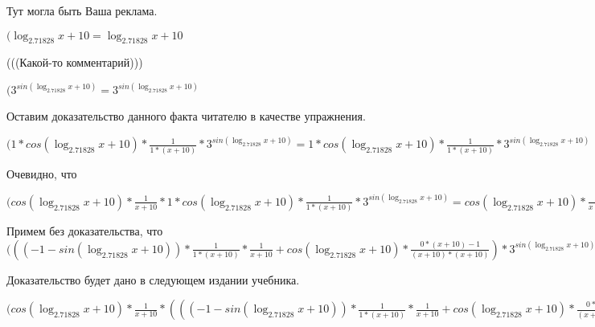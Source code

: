 \documentclass[12pt,a4paper,fleqn]{article}
\theoremstyle{definition}
\begin{document}
Тут могла быть Ваша реклама.

$(\log_{ 2.71828 }{ x  +  10 } = \log_{ 2.71828 }{ x  +  10 }$

(((Какой-то комментарий)))

$({ 3 }^{sin(\log_{ 2.71828 }{ x  +  10 })} = { 3 }^{sin(\log_{ 2.71828 }{ x  +  10 })}$

Оставим доказательство данного факта читателю в качестве упражнения.

$( 1  * cos(\log_{ 2.71828 }{ x  +  10 }) * \frac{ 1 }{ 1  * ( x  +  10 )}
 * { 3 }^{sin(\log_{ 2.71828 }{ x  +  10 })} =  1  * cos(\log_{ 2.71828 }{ x  +  10 }) * \frac{ 1 }{ 1  * ( x  +  10 )}
 * { 3 }^{sin(\log_{ 2.71828 }{ x  +  10 })}$

Очевидно, что

$(cos(\log_{ 2.71828 }{ x  +  10 }) * \frac{ 1 }{ x  +  10 }
 *  1  * cos(\log_{ 2.71828 }{ x  +  10 }) * \frac{ 1 }{ 1  * ( x  +  10 )}
 * { 3 }^{sin(\log_{ 2.71828 }{ x  +  10 })} = cos(\log_{ 2.71828 }{ x  +  10 }) * \frac{ 1 }{ x  +  10 }
 *  1  * cos(\log_{ 2.71828 }{ x  +  10 }) * \frac{ 1 }{ 1  * ( x  +  10 )}
 * { 3 }^{sin(\log_{ 2.71828 }{ x  +  10 })}$

Примем без доказательства, что
$((( -1  - sin(\log_{ 2.71828 }{ x  +  10 })) * \frac{ 1 }{ 1  * ( x  +  10 )}
 * \frac{ 1 }{ x  +  10 }
 + cos(\log_{ 2.71828 }{ x  +  10 }) * \frac{ 0  * ( x  +  10 ) -  1 }{( x  +  10 ) * ( x  +  10 )}
) * { 3 }^{sin(\log_{ 2.71828 }{ x  +  10 })} + cos(\log_{ 2.71828 }{ x  +  10 }) * \frac{ 1 }{ x  +  10 }
 *  1  * cos(\log_{ 2.71828 }{ x  +  10 }) * \frac{ 1 }{ 1  * ( x  +  10 )}
 * { 3 }^{sin(\log_{ 2.71828 }{ x  +  10 })} = (( -1  - sin(\log_{ 2.71828 }{ x  +  10 })) * \frac{ 1 }{ 1  * ( x  +  10 )}
 * \frac{ 1 }{ x  +  10 }
 + cos(\log_{ 2.71828 }{ x  +  10 }) * \frac{ 0  * ( x  +  10 ) -  1 }{( x  +  10 ) * ( x  +  10 )}
) * { 3 }^{sin(\log_{ 2.71828 }{ x  +  10 })} + cos(\log_{ 2.71828 }{ x  +  10 }) * \frac{ 1 }{ x  +  10 }
 *  1  * cos(\log_{ 2.71828 }{ x  +  10 }) * \frac{ 1 }{ 1  * ( x  +  10 )}
 * { 3 }^{sin(\log_{ 2.71828 }{ x  +  10 })}$

Доказательство будет дано в следующем издании учебника.

$(cos(\log_{ 2.71828 }{ x  +  10 }) * \frac{ 1 }{ x  +  10 }
 * ((( -1  - sin(\log_{ 2.71828 }{ x  +  10 })) * \frac{ 1 }{ 1  * ( x  +  10 )}
 * \frac{ 1 }{ x  +  10 }
 + cos(\log_{ 2.71828 }{ x  +  10 }) * \frac{ 0  * ( x  +  10 ) -  1 }{( x  +  10 ) * ( x  +  10 )}
) * { 3 }^{sin(\log_{ 2.71828 }{ x  +  10 })} + cos(\log_{ 2.71828 }{ x  +  10 }) * \frac{ 1 }{ x  +  10 }
 *  1  * cos(\log_{ 2.71828 }{ x  +  10 }) * \frac{ 1 }{ 1  * ( x  +  10 )}
 * { 3 }^{sin(\log_{ 2.71828 }{ x  +  10 })}) = cos(\log_{ 2.71828 }{ x  +  10 }) * \frac{ 1 }{ x  +  10 }
 * ((( -1  - sin(\log_{ 2.71828 }{ x  +  10 })) * \frac{ 1 }{ 1  * ( x  +  10 )}
 * \frac{ 1 }{ x  +  10 }
 + cos(\log_{ 2.71828 }{ x  +  10 }) * \frac{ 0  * ( x  +  10 ) -  1 }{( x  +  10 ) * ( x  +  10 )}
) * { 3 }^{sin(\log_{ 2.71828 }{ x  +  10 })} + cos(\log_{ 2.71828 }{ x  +  10 }) * \frac{ 1 }{ x  +  10 }
 *  1  * cos(\log_{ 2.71828 }{ x  +  10 }) * \frac{ 1 }{ 1  * ( x  +  10 )}
 * { 3 }^{sin(\log_{ 2.71828 }{ x  +  10 })})$
\end{document}
